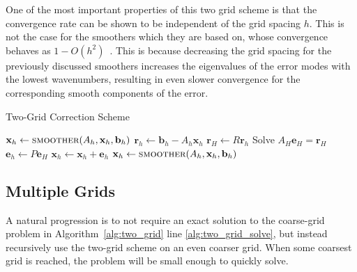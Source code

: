 One of the most important properties of this two grid scheme is that the convergence rate can be shown to be independent of the grid spacing $h$. This is not the case for the smoothers which they are based on, whose convergence behaves as $1 - O(h^2)$~\cite{Wesseling2004}. This is because decreasing the grid spacing for the previously discussed smoothers increases the eigenvalues of the error modes with the lowest wavenumbers, resulting in even slower convergence for the corresponding smooth components of the error.

\begin{algorithm}
	\caption{Two-Grid Correction Scheme}\label{alg:two_grid}
	\begin{algorithmic}[1]
			\State $\mathbf{x}_h \gets \Call{smoother}{A_h, \mathbf{x}_h, \mathbf{b}_h}$ 
		\EndFor
		\State $\mathbf{r}_h \gets \mathbf{b}_h - A_h \mathbf{x}_h$ 
		\State $\mathbf{r}_H \gets R \mathbf{r}_h$ 
		\State Solve $A_H \mathbf{e}_H = \mathbf{r}_H$  \label{alg:two_grid_solve}
		\State $\mathbf{e}_h \gets P \mathbf{e}_H$ 
		\State $\mathbf{x}_h \gets \mathbf{x}_h + \mathbf{e}_h$ 
			\State $\mathbf{x}_h \gets \Call{smoother}{A_h, \mathbf{x}_h, \mathbf{b}_h}$ 
		\EndFor
		\EndProcedure
	\end{algorithmic}
\end{algorithm}

\subsection{Multiple Grids}

A natural progression is to not require an exact solution to the coarse-grid problem in Algorithm~\ref{alg:two_grid} line \ref{alg:two_grid_solve}, but instead recursively use the two-grid scheme on an even coarser grid. When some coarsest grid is reached, the problem will be small enough to quickly solve.

